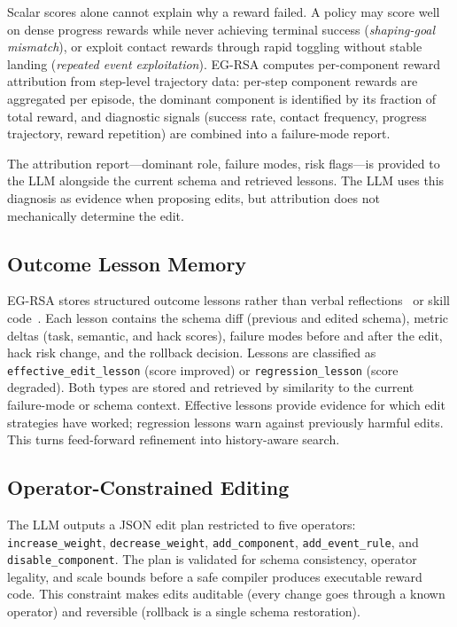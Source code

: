 \documentclass[11pt]{article}
\begin{document}
Scalar scores alone cannot explain why a reward failed. A policy may score well on dense progress rewards while never achieving terminal success (\emph{shaping-goal mismatch}), or exploit contact rewards through rapid toggling without stable landing (\emph{repeated event exploitation}). EG-RSA computes per-component reward attribution from step-level trajectory data: per-step component rewards are aggregated per episode, the dominant component is identified by its fraction of total reward, and diagnostic signals (success rate, contact frequency, progress trajectory, reward repetition) are combined into a failure-mode report.

The attribution report---dominant role, failure modes, risk flags---is provided to the LLM alongside the current schema and retrieved lessons. The LLM uses this diagnosis as evidence when proposing edits, but attribution does not mechanically determine the edit.

\subsection{Outcome Lesson Memory}

EG-RSA stores structured outcome lessons rather than verbal reflections~\citep{shinn2023reflexion} or skill code~\citep{wang2023voyager}. Each lesson contains the schema diff (previous and edited schema), metric deltas (task, semantic, and hack scores), failure modes before and after the edit, hack risk change, and the rollback decision. Lessons are classified as \texttt{effective\_edit\_lesson} (score improved) or \texttt{regression\_lesson} (score degraded). Both types are stored and retrieved by similarity to the current failure-mode or schema context. Effective lessons provide evidence for which edit strategies have worked; regression lessons warn against previously harmful edits. This turns feed-forward refinement into history-aware search.

\subsection{Operator-Constrained Editing}

The LLM outputs a JSON edit plan restricted to five operators: \texttt{increase\_weight}, \texttt{decrease\_weight}, \texttt{add\_component}, \texttt{add\_event\_rule}, and \texttt{disable\_component}. The plan is validated for schema consistency, operator legality, and scale bounds before a safe compiler produces executable reward code. This constraint makes edits auditable (every change goes through a known operator) and reversible (rollback is a single schema restoration).
\end{document}
